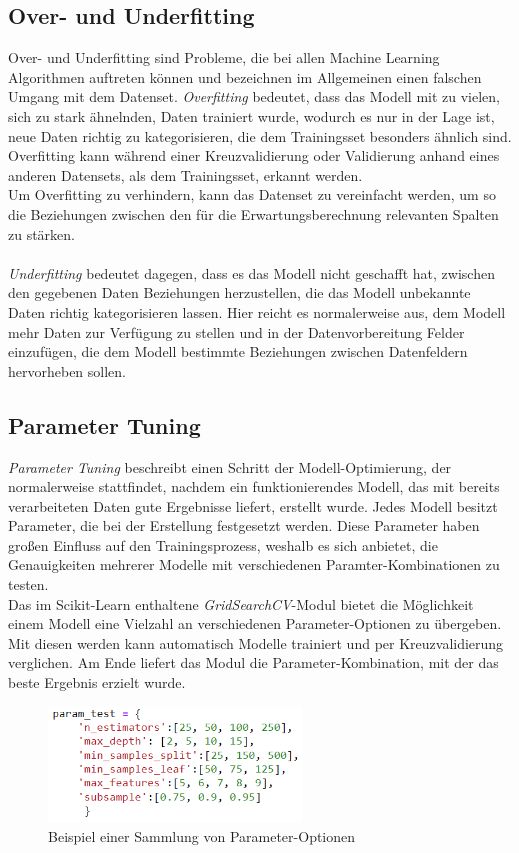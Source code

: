 \subsection{Over- und Underfitting}
Over- und Underfitting sind Probleme, die bei allen Machine Learning Algorithmen auftreten können und bezeichnen 
im Allgemeinen einen falschen Umgang mit dem Datenset.
\textit{Overfitting} bedeutet, dass das Modell mit zu vielen, sich zu stark ähnelnden, Daten trainiert wurde, 
wodurch es nur in der Lage ist, neue Daten richtig zu kategorisieren, die dem Trainingsset besonders ähnlich sind.
Overfitting kann während einer Kreuzvalidierung oder Validierung anhand eines anderen Datensets, als dem 
Trainingsset, erkannt werden.\\
Um Overfitting zu verhindern, kann das Datenset zu vereinfacht werden, um so die Beziehungen zwischen den
für die Erwartungsberechnung relevanten Spalten zu stärken.\\\\
\textit{Underfitting} bedeutet dagegen, dass es das Modell nicht geschafft hat, zwischen den gegebenen Daten
Beziehungen herzustellen, die das Modell unbekannte Daten richtig kategorisieren lassen. Hier reicht es 
normalerweise aus, dem Modell mehr Daten zur Verfügung zu stellen und in der Datenvorbereitung Felder 
einzufügen, die dem Modell bestimmte Beziehungen zwischen Datenfeldern hervorheben sollen. 

\subsection{Parameter Tuning}
\textit{Parameter Tuning} beschreibt einen Schritt der Modell-Optimierung, der normalerweise stattfindet, 
nachdem ein funktionierendes Modell, das mit bereits verarbeiteten Daten gute Ergebnisse liefert, erstellt 
wurde. Jedes Modell besitzt Parameter, die bei der Erstellung festgesetzt werden. Diese Parameter haben 
großen Einfluss auf den Trainingsprozess, weshalb es sich anbietet, die Genauigkeiten mehrerer Modelle 
mit verschiedenen Paramter-Kombinationen zu testen.\\
Das im Scikit-Learn enthaltene \textit{GridSearchCV}-Modul
bietet die Möglichkeit einem Modell eine Vielzahl an verschiedenen Parameter-Optionen zu übergeben. Mit diesen 
werden kann automatisch Modelle trainiert und per Kreuzvalidierung verglichen. Am Ende liefert das Modul 
die Parameter-Kombination, mit der das beste Ergebnis erzielt wurde.

\begin{figure}[h]
    \centering
    \includegraphics[width=0.6\textwidth]{pic/param_test.png}
    \caption{Beispiel einer Sammlung von Parameter-Optionen}
    \label{fig:Param_Test}
\end{figure}


